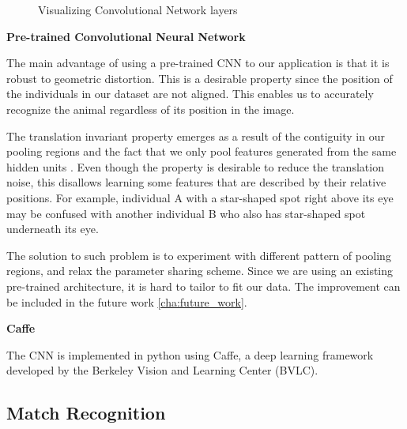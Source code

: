 \begin{figure}[h!]
  \captionsetup{justification=centering}
  \caption{Visualizing Convolutional Network layers}
\end{figure}


\textbf{Pre-trained Convolutional Neural Network}

The main advantage of using a pre-trained CNN to our application is that it is
robust to geometric distortion. This is a desirable property since the position
of the individuals in our dataset are not aligned. This enables us to
accurately recognize the animal regardless of its position in the image. 

The translation invariant property emerges as a result of the contiguity in our
pooling regions and the fact that we only pool features generated from the same
hidden units \cite{ufldl}. Even though the property is desirable to reduce the
translation noise, this disallows learning some features that are described by
their relative positions. For example, individual A with a star-shaped spot
right above its eye may be confused with another individual B who also has
star-shaped spot underneath its eye. 

The solution to such problem is to experiment with different pattern of pooling
regions, and relax the parameter sharing scheme. Since we are using an existing
pre-trained architecture, it is hard to tailor to fit our data. The improvement
can be included in the future work \ref{cha:future_work}.

\textbf{Caffe}

The CNN is implemented in python using Caffe\cite{caffe}, a deep learning
framework developed by the Berkeley Vision and Learning Center (BVLC).

\subsection{Match Recognition}


